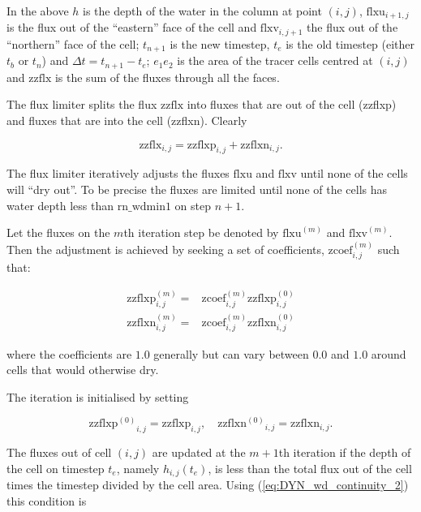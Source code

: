 \documentclass[../main/NEMO_manual]{subfiles}
\begin{document}
In the above $h$ is the depth of the water in the column at point $(i,j)$,
$\mathrm{flxu}_{i+1,j}$ is the flux out of the ``eastern'' face of the cell and
$\mathrm{flxv}_{i,j+1}$ the flux out of the ``northern'' face of the cell; $t_{n+1}$ is
the new timestep, $t_e$ is the old timestep (either $t_b$ or $t_n$) and $ \Delta t =
t_{n+1} - t_e$; $e_1 e_2$ is the area of the tracer cells centred at $(i,j)$ and
$\mathrm{zzflx}$ is the sum of the fluxes through all the faces.

The flux limiter splits the flux $\mathrm{zzflx}$ into fluxes that are out of the cell
(zzflxp) and fluxes that are into the cell (zzflxn).  Clearly

\begin{equation}
  \label{eq:DYN_wd_zzflx_p_n_1}
  \mathrm{zzflx}_{i,j} = \mathrm{zzflxp}_{i,j} + \mathrm{zzflxn}_{i,j} .
\end{equation}

The flux limiter iteratively adjusts the fluxes $\mathrm{flxu}$ and $\mathrm{flxv}$ until
none of the cells will ``dry out''. To be precise the fluxes are limited until none of the
cells has water depth less than $\mathrm{rn\_wdmin1}$ on step $n+1$.

Let the fluxes on the $m$th iteration step be denoted by $\mathrm{flxu}^{(m)}$ and
$\mathrm{flxv}^{(m)}$.  Then the adjustment is achieved by seeking a set of coefficients,
$\mathrm{zcoef}_{i,j}^{(m)}$ such that:

\begin{equation}
  \label{eq:DYN_wd_continuity_coef}
  \begin{split}
    \mathrm{zzflxp}^{(m)}_{i,j} =& \mathrm{zcoef}_{i,j}^{(m)} \mathrm{zzflxp}^{(0)}_{i,j} \\
    \mathrm{zzflxn}^{(m)}_{i,j} =& \mathrm{zcoef}_{i,j}^{(m)} \mathrm{zzflxn}^{(0)}_{i,j}
  \end{split}
\end{equation}

where the coefficients are $1.0$ generally but can vary between $0.0$ and $1.0$ around
cells that would otherwise dry.

The iteration is initialised by setting

\begin{equation}
  \label{eq:DYN_wd_zzflx_initial}
  \mathrm{zzflxp^{(0)}}_{i,j} = \mathrm{zzflxp}_{i,j} , \quad  \mathrm{zzflxn^{(0)}}_{i,j} = \mathrm{zzflxn}_{i,j} .
\end{equation}

The fluxes out of cell $(i,j)$ are updated at the $m+1$th iteration if the depth of the
cell on timestep $t_e$, namely $h_{i,j}(t_e)$, is less than the total flux out of the cell
times the timestep divided by the cell area. Using (\autoref{eq:DYN_wd_continuity_2}) this
condition is
\end{document}
